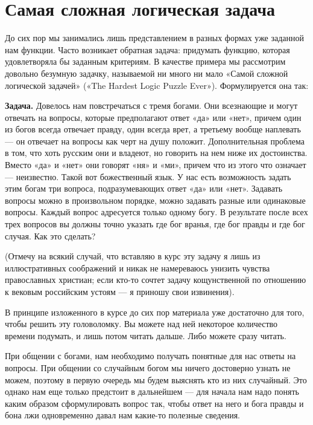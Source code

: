 \section{Самая сложная логическая задача}

До сих пор мы занимались лишь представлением в разных формах уже заданной нам функции. Часто возникает обратная задача: придумать функцию, которая удовлетворяла бы заданным критериям. В качестве примера мы рассмотрим довольно безумную задачку, называемой ни много ни мало «Самой сложной логической задачей» («The Hardest Logic Puzzle Ever»). Формулируется она так:

{\bfseries Задача.} Довелось нам повстречаться с тремя богами. Они всезнающие и могут отвечать на вопросы, которые предполагают ответ «да» или «нет», причем один из богов всегда отвечает правду, один всегда врет, а третьему вообще наплевать — он отвечает на вопросы как черт на душу положит. Дополнительная проблема в том, что хоть русским они и владеют, но говорить на нем ниже их достоинства. Вместо «да» и «нет» они говорят «ня» и «ми», причем что из этого что означает — неизвестно. Такой вот божественный язык. У нас есть возможность задать этим богам три вопроса, подразумевающих ответ «да» или «нет». Задавать вопросы можно в произвольном порядке, можно задавать разные или одинаковые вопросы. Каждый вопрос адресуется только одному богу. В результате после всех трех вопросов вы должны точно указать где бог вранья, где бог правды и где бог случая. Как это сделать?


(Отмечу на всякий случай, что вставляю в курс эту задачу я лишь из иллюстративных соображений и никак не намереваюсь унизить чувства православных христиан; если кто-то сочтет задачу кощунственной по отношению к вековым российским устоям  — я приношу свои извинения).

В принципе изложенного в курсе до сих пор материала уже достаточно для того, чтобы решить эту головоломку. Вы можете над ней некоторое количество времени подумать, и лишь потом читать дальше. Либо можете сразу читать.

При общении с богами, нам необходимо получать понятные для нас ответы на вопросы. При общении со случайным богом мы ничего достоверно узнать не можем, поэтому в первую очередь мы будем выяснять кто из них случайный. Это однако нам еще только предстоит в дальнейшем — для начала нам надо понять каким образом сформулировать вопрос так, чтобы ответ на него и бога правды и бона лжи одновременно давал нам какие-то полезные сведения.

